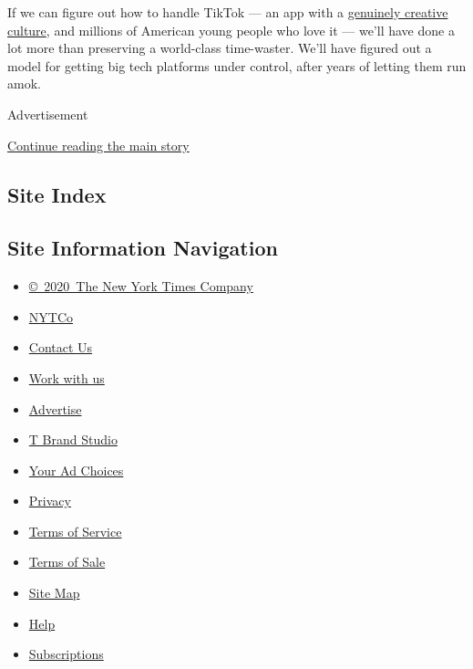 If we can figure out how to handle TikTok --- an app with a
\href{https://www.nytimes.com/2020/07/10/style/tiktok-ban-us-users-influencers-taylor-lorenz.html}{genuinely
creative culture}, and millions of American young people who love it ---
we'll have done a lot more than preserving a world-class time-waster.
We'll have figured out a model for getting big tech platforms under
control, after years of letting them run amok.

Advertisement

\protect\hyperlink{after-bottom}{Continue reading the main story}

\hypertarget{site-index}{%
\subsection{Site Index}\label{site-index}}

\hypertarget{site-information-navigation}{%
\subsection{Site Information
Navigation}\label{site-information-navigation}}

\begin{itemize}
\tightlist
\item
  \href{https://help.nytimes.com/hc/en-us/articles/115014792127-Copyright-notice}{©~2020~The
  New York Times Company}
\end{itemize}

\begin{itemize}
\tightlist
\item
  \href{https://www.nytco.com/}{NYTCo}
\item
  \href{https://help.nytimes.com/hc/en-us/articles/115015385887-Contact-Us}{Contact
  Us}
\item
  \href{https://www.nytco.com/careers/}{Work with us}
\item
  \href{https://nytmediakit.com/}{Advertise}
\item
  \href{http://www.tbrandstudio.com/}{T Brand Studio}
\item
  \href{https://www.nytimes.com/privacy/cookie-policy\#how-do-i-manage-trackers}{Your
  Ad Choices}
\item
  \href{https://www.nytimes.com/privacy}{Privacy}
\item
  \href{https://help.nytimes.com/hc/en-us/articles/115014893428-Terms-of-service}{Terms
  of Service}
\item
  \href{https://help.nytimes.com/hc/en-us/articles/115014893968-Terms-of-sale}{Terms
  of Sale}
\item
  \href{https://spiderbites.nytimes.com}{Site Map}
\item
  \href{https://help.nytimes.com/hc/en-us}{Help}
\item
  \href{https://www.nytimes.com/subscription?campaignId=37WXW}{Subscriptions}
\end{itemize}
